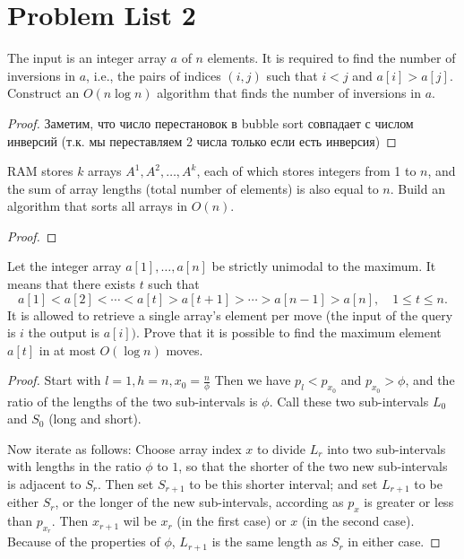 \section{Problem List 2}

\begin{prob}
The input is an integer array $a$ of $n$ elements. It is required to find the number of inversions in $a$, i.e., the pairs of indices $(i, j)$ such that $i<j$ and $a[i]>a[j]$. Construct an $O(n \log n)$ algorithm that finds the number of inversions in $a$.
\end{prob}

\begin{proof}
Заметим, что число перестановок в bubble sort совпадает с числом инверсий (т.к. мы переставляем 2 числа только если есть инверсия)
\end{proof}
\vskip 0.6in



\begin{prob}
RAM stores $k$ arrays $A^1, A^2, \ldots, A^k$, each of which stores integers from 1 to $n$, and the sum of array lengths (total number of elements) is also equal to $n$. Build an algorithm that sorts all arrays in $O(n)$.
\end{prob}

\begin{proof}

\end{proof}
\vskip 0.6in



\begin{prob}
Let the integer array $a[1], \ldots, a[n]$ be strictly unimodal to the maximum. It means that there exists $t$ such that
$$
a[1]<a[2]<\cdots<a[t]>a[t+1]>\cdots>a[n-1]>a[n], \quad 1 \leqslant t \leqslant n .
$$
It is allowed to retrieve a single array's element per move (the input of the query is $i$ the output is $a[i])$. Prove that it is possible to find the maximum element $a[t]$ in at most $O(\log n)$ moves.
\end{prob}

\begin{proof}
Start with $l = 1, h = n, x_0 = \frac{n}{\phi}$
Then we have $p_l < p_{x_0}$
and $p_{x_0} > \phi$, and the ratio of the lengths of the two sub-intervals is $\phi$. Call these two sub-intervals $L_0$ and $S_0$ (long and short).

Now iterate as follows:
Choose array index $x$ to divide $L_r$ into two sub-intervals with lengths in the ratio $\phi$ to $1$, so that the shorter of the two new sub-intervals is adjacent to $S_r$. Then set $S_{r+1}$ to be this shorter interval; and set $L_{r+1}$ to be either $S_r$, or the longer of the new sub-intervals, according as $p_x$ is greater or less than $p_{x_r}$. Then $x_{r+1}$ wil be $x_r$ (in the first case) or $x$ (in the second case). Because of the properties of $\phi$, $L_{r+1}$ is the same length as $S_r$ in either case.
\end{proof}
\vskip 0.6in



